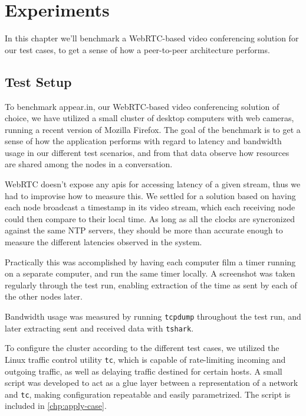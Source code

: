\chapter{Experiments}\label{chp:experiments}

In this chapter we'll benchmark a WebRTC-based video conferencing solution for our test cases, to get a sense of how a peer-to-peer architecture performs.


\section{Test Setup}

To benchmark appear.in, our WebRTC-based video conferencing solution of choice, we have utilized a small cluster of desktop computers with web cameras, running a recent version of Mozilla Firefox. The goal of the benchmark is to get a sense of how the application performs with regard to latency and bandwidth usage in our different test scenarios, and from that data observe how resources are shared among the nodes in a conversation.

WebRTC doesn't expose any \glspl{api} for accessing latency of a given stream, thus we had to improvise how to measure this. We settled for a solution based on having each node broadcast a timestamp in its video stream, which each receiving node could then compare to their local time. As long as all the clocks are syncronized against the same NTP servers, they should be more than accurate enough to measure the different latencies observed in the system.

Practically this was accomplished by having each computer film a timer running on a separate computer, and run the same timer locally. A screenshot was taken regularly through the test run, enabling extraction of the time as sent by each of the other nodes later.

Bandwidth usage was measured by running \texttt{tcpdump} throughout the test run, and later extracting sent and received data with \texttt{tshark}.

To configure the cluster according to the different test cases, we utilized the Linux traffic control utility \texttt{tc}, which is capable of rate-limiting incoming and outgoing traffic, as well as delaying traffic destined for certain hosts. A small script was developed to act as a glue layer between a representation of a network and \texttt{tc}, making configuration repeatable and easily parametrized. The script is included in \autoref{chp:apply-case}.

